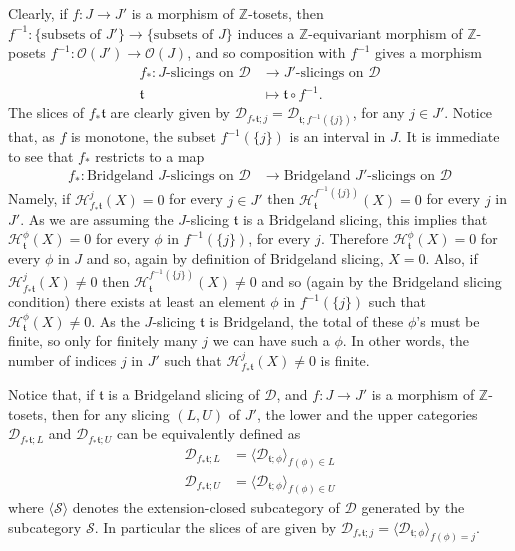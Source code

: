 \documentclass{article}
\theoremstyle{definition}
\newcommand{\Z}{\mathbb{Z}}
\newcommand{\Oo}{\mathcal{O}}
\newcommand{\tee}{\mathfrak{t}}
\begin{document}
Clearly, if $f\colon J\to J'$ is a morphism of $\Z$-tosets, then $f^{-1}\colon \{\text{subsets of $J'$}\}\to \{\text{subsets of $J$}\}$ induces a $\Z$-equivariant morphism of $\Z$-posets $f^{-1}\colon \Oo(J')\to \Oo(J)$, and so composition with $f^{-1}$ gives a morphism
\begin{align*}
f_*\colon J\text{-slicings on $\mathscr{D}$}&\to J'\text{-slicings on $\mathscr{D}$}\\
\tee&\mapsto \tee\circ f^{-1}.
\end{align*}
The slices of $f_*\tee$ are clearly given by $\mathscr{D}_{f_*\tee;j}=\mathscr{D}_{\tee;f^{-1}(\{j\})}$, for any $j\in J'$. Notice that, as $f$ is monotone, the subset $f^{-1}(\{j\})$ is an interval in $J$. It is immediate to see that $f_*$ restricts to a map
\begin{align*}
f_*\colon \text{Bridgeland $J$-slicings on $\mathscr{D}$}&\to \text{Bridgeland $J'$-slicings on $\mathscr{D}$}
\end{align*}
Namely, if $\mathcal{H}^j_{f_*\tee}(X)=0$ for every $j\in J'$ then $\mathcal{H}^{f^{-1}(\{j\})}_{\tee}(X)=0$ for every $j$ in $J'$. As we are assuming the $J$-slicing $\tee$ is a Bridgeland slicing, this implies that $\mathcal{H}^{\phi}_{\tee}(X)=0$ for every $\phi$ in $f^{-1}(\{j\})$, for every $j$. Therefore $\mathcal{H}^{\phi}_{\tee}(X)=0$ for every $\phi$ in $J$ and so, again by definition of Bridgeland slicing, $X=0$. Also, if $\mathcal{H}^j_{f_*\tee}(X)\neq 0$ then $\mathcal{H}^{f^{-1}(\{j\})}_{\tee}(X)\neq 0$ and so (again by the Bridgeland slicing condition) there exists at least an element $\phi$ in $f^{-1}(\{j\})$ such that $\mathcal{H}^{\phi}_{\tee}(X)\neq 0$. As the $J$-slicing $\tee$ is Bridgeland, the total of these $\phi$'s must be finite, so only for finitely many $j$ we can have such a $\phi$. In other words, the number of indices $j$ in $J'$ such that $\mathcal{H}^j_{f_*\tee}(X)\neq 0$ is finite.

Notice that, if $\tee$ is a Bridgeland slicing of $\mathscr{D}$, and $f\colon J\to J'$ is a morphism of $\Z$-tosets, then for any slicing $(L,U)$ of $J'$, the lower and the upper categories
$\mathscr{D}_{f_*\tee;L}$ and $\mathscr{D}_{f_*\tee;U}$ can be equivalently defined as
\begin{align*}
\mathscr{D}_{f_*\tee;L}&=\langle \mathscr{D}_{\tee;\phi}\rangle_{f(\phi)\in L}\\
\mathscr{D}_{f_*\tee;U}&=\langle \mathscr{D}_{\tee;\phi}\rangle_{f(\phi)\in U}
\end{align*}
where $\langle \mathscr{S}\rangle$ denotes the extension-closed subcategory of $\mathscr{D}$ generated by the subcategory $\mathscr{S}$. In particular the slices of are given by 
$\mathscr{D}_{f_*\tee;j}=\langle \mathscr{D}_{\tee;\phi}\rangle_{f(\phi)=j}$.\\
\end{document}
